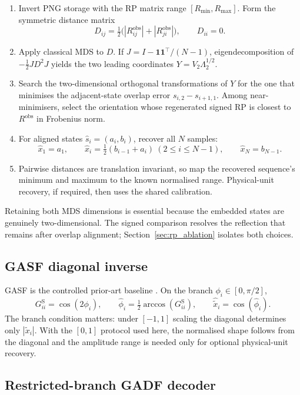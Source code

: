 \documentclass[10pt,a4paper,parskip=half-]{scrartcl}
\begin{document}
\begin{enumerate}
\item Invert PNG storage with the RP matrix range \([R_{\min},R_{\max}]\). Form the symmetric distance matrix
\[
D_{ij}=\tfrac12\bigl(|R^{\mathrm{obs}}_{ij}|+|R^{\mathrm{obs}}_{ji}|\bigr),\qquad D_{ii}=0.
\]
\item Apply classical MDS to \(D\). If \(J=I-\mathbf1\mathbf1^\top/(N-1)\), eigendecomposition of \(-\tfrac12JD^2J\) yields the two leading coordinates \(Y=V_2\Lambda_2^{1/2}\).

\item Search the two-dimensional orthogonal transformations of \(Y\) for the one that minimises the adjacent-state overlap error \(s_{i,2}-s_{i+1,1}\). Among near-minimisers, select the orientation whose regenerated signed RP is closest to \(R^{\mathrm{obs}}\) in Frobenius norm.
\item For aligned states \(\hat s_i=(a_i,b_i)\), recover all \(N\) samples:
\[
\hat x_1=a_1,\qquad
\hat x_i=\tfrac12(b_{i-1}+a_i)\ (2\le i\le N-1),\qquad
\hat x_N=b_{N-1}.
\]
\item Pairwise distances are translation invariant, so map the recovered sequence's minimum and maximum to the known normalised range. Physical-unit recovery, if required, then uses the shared calibration.
\end{enumerate}

Retaining both MDS dimensions is essential because the embedded states are genuinely two-dimensional. The signed comparison resolves the reflection that remains after overlap alignment; Section~\ref{sec:rp_ablation} isolates both choices.

\subsection{GASF diagonal inverse}
\label{sec:gasf_reconstruction_method}

GASF is the controlled prior-art baseline \cite{huamin2020reconstruction}. On the branch \(\phi_i\in[0,\pi/2]\),
\[
G^{\mathrm S}_{ii}=\cos(2\phi_i),\qquad
\hat\phi_i=\tfrac12\arccos(G^{\mathrm S}_{ii}),\qquad
\hat{\tilde x}_i=\cos(\hat\phi_i).
\]
The branch condition matters: under \([-1,1]\) scaling the diagonal determines only \(|\tilde x_i|\). With the \([0,1]\) protocol used here, the normalised shape follows from the diagonal and the amplitude range is needed only for optional physical-unit recovery.

\subsection{Restricted-branch GADF decoder}
\label{sec:gadf_reconstruction_proposal}
\end{document}
